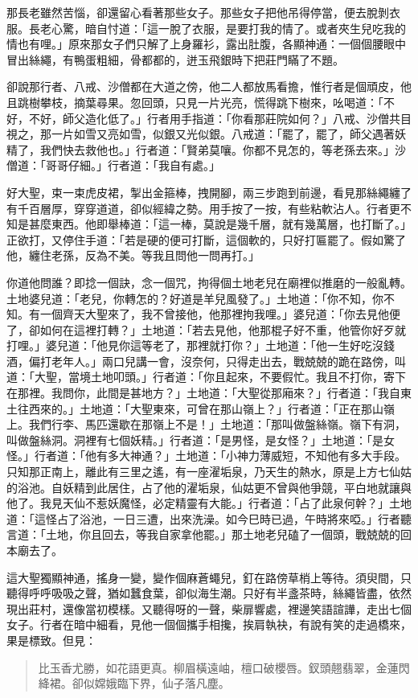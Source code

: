 那長老雖然苦惱，卻還留心看著那些女子。那些女子把他吊得停當，便去脫剝衣服。長老心驚，暗自忖道：「這一脫了衣服，是要打我的情了。或者夾生兒吃我的情也有哩。」原來那女子們只解了上身羅衫，露出肚腹，各顯神通：一個個腰眼中冒出絲繩，有鴨蛋粗細，骨都都的，迸玉飛銀時下把莊門瞞了不題。

卻說那行者、八戒、沙僧都在大道之傍，他二人都放馬看擔，惟行者是個頑皮，他且跳樹攀枝，摘葉尋果。忽回頭，只見一片光亮，慌得跳下樹來，吆喝道：「不好，不好，師父造化低了。」行者用手指道：「你看那莊院如何？」八戒、沙僧共目視之，那一片如雪又亮如雪，似銀又光似銀。八戒道：「罷了，罷了，師父遇著妖精了，我們快去救他也。」行者道：「賢弟莫嚷。你都不見怎的，等老孫去來。」沙僧道：「哥哥仔細。」行者道：「我自有處。」

好大聖，束一束虎皮裙，掣出金箍棒，拽開腳，兩三步跑到前邊，看見那絲繩纏了有千百層厚，穿穿道道，卻似經緯之勢。用手按了一按，有些粘軟沾人。行者更不知是甚麼東西。他即舉棒道：「這一棒，莫說是幾千層，就有幾萬層，也打斷了。」正欲打，又停住手道：「若是硬的便可打斷，這個軟的，只好打匾罷了。假如驚了他，纏住老孫，反為不美。等我且問他一問再打。」

你道他問誰？即捻一個訣，念一個咒，拘得個土地老兒在廟裡似推磨的一般亂轉。土地婆兒道：「老兒，你轉怎的？好道是羊兒風發了。」土地道：「你不知，你不知。有一個齊天大聖來了，我不曾接他，他那裡拘我哩。」婆兒道：「你去見他便了，卻如何在這裡打轉？」土地道：「若去見他，他那棍子好不重，他管你好歹就打哩。」婆兒道：「他見你這等老了，那裡就打你？」土地道：「他一生好吃沒錢酒，偏打老年人。」兩口兒講一會，沒奈何，只得走出去，戰兢兢的跪在路傍，叫道：「大聖，當境土地叩頭。」行者道：「你且起來，不要假忙。我且不打你，寄下在那裡。我問你，此間是甚地方？」土地道：「大聖從那廂來？」行者道：「我自東土往西來的。」土地道：「大聖東來，可曾在那山嶺上？」行者道：「正在那山嶺上。我們行李、馬匹還歇在那嶺上不是！」土地道：「那叫做盤絲嶺。嶺下有洞，叫做盤絲洞。洞裡有七個妖精。」行者道：「是男怪，是女怪？」土地道：「是女怪。」行者道：「他有多大神通？」土地道：「小神力薄威短，不知他有多大手段。只知那正南上，離此有三里之遙，有一座濯垢泉，乃天生的熱水，原是上方七仙姑的浴池。自妖精到此居住，占了他的濯垢泉，仙姑更不曾與他爭競，平白地就讓與他了。我見天仙不惹妖魔怪，必定精靈有大能。」行者道：「占了此泉何幹？」土地道：「這怪占了浴池，一日三遭，出來洗澡。如今巳時已過，午時將來啞。」行者聽言道：「土地，你且回去，等我自家拿他罷。」那土地老兒磕了一個頭，戰兢兢的回本廟去了。

這大聖獨顯神通，搖身一變，變作個麻蒼蠅兒，釘在路傍草梢上等待。須臾間，只聽得呼呼吸吸之聲，猶如蠶食葉，卻似海生潮。只好有半盞茶時，絲繩皆盡，依然現出莊村，還像當初模樣。又聽得呀的一聲，柴扉響處，裡邊笑語諠譁，走出七個女子。行者在暗中細看，見他一個個攜手相攙，挨肩執袂，有說有笑的走過橋來，果是標致。但見：
\begin{quote}
比玉香尤勝，如花語更真。柳眉橫遠岫，檀口破櫻唇。釵頭翹翡翠，金蓮閃絳裙。卻似嫦娥臨下界，仙子落凡塵。
\end{quote}

